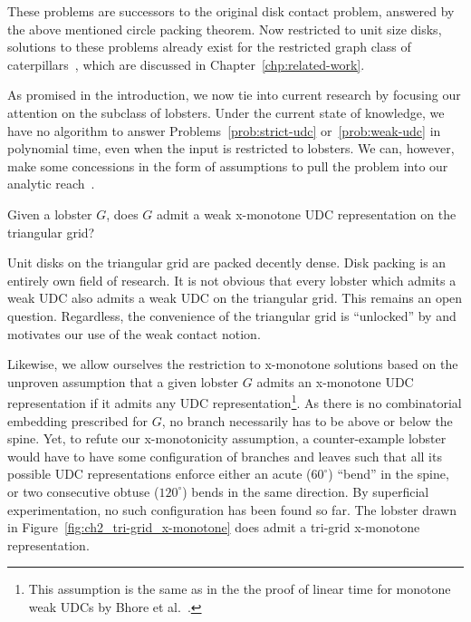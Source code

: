 These problems are successors to the original disk contact problem, answered by the above mentioned circle packing theorem. Now restricted to unit size disks, solutions to these problems already exist for the restricted graph class of caterpillars~\cite{Klemz2015,Cleve2020}, which are discussed in Chapter~\ref{chp:related-work}.

As promised in the introduction, we now tie into current research by focusing our attention on the subclass of lobsters. Under the current state of knowledge, we have no algorithm to answer Problems~\ref{prob:strict-udc} or~\ref{prob:weak-udc} in polynomial time, even when the input is restricted to lobsters. We can, however, make some concessions in the form of assumptions to pull the problem into our analytic reach~\cite{Bhore2021}.

\begin{problem}
Given a lobster $G$, does $G$ admit a weak x-monotone UDC representation on the triangular grid?
\label{prob:weak-udc-lobster}
\end{problem}

Unit disks on the triangular grid are packed decently dense. Disk packing is an entirely own field of research. It is not obvious that every lobster which admits a weak UDC also admits a weak UDC on the triangular grid. This remains an open question. Regardless, the convenience of the triangular grid is ``unlocked'' by and motivates our use of the weak contact notion.


Likewise, we allow ourselves the restriction to x-monotone solutions based on the unproven assumption that a given lobster $G$ admits an x-monotone UDC representation if it admits any UDC representation\footnote{This assumption is the same as in the the proof of linear time for monotone weak UDCs by Bhore et al.~\cite{Bhore2021}.}. As there is no combinatorial embedding prescribed for $G$, no branch necessarily has to be above or below the spine. Yet, to refute our x-monotonicity assumption, a counter-example lobster would have to have some configuration of branches and leaves such that all its possible UDC representations enforce either an acute ($60^\circ$) ``bend'' in the spine, or two consecutive obtuse ($120^\circ$) bends in the same direction. By superficial experimentation, no such configuration has been found so far. The lobster drawn in Figure~\ref{fig:ch2_tri-grid_x-monotone} does admit a tri-grid x-monotone representation.

